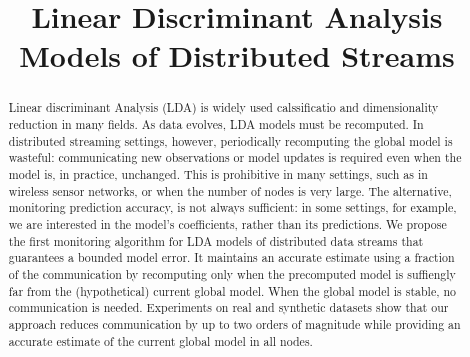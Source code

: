 \documentclass[11pt,twocolumn,varwidth=true,a4paper,fleqn]{article}
\begin{document}
\nocite{*}

\title{Linear Discriminant Analysis Models of Distributed Streams}
\date{}
\maketitle

\begin{abstract}
Linear discriminant Analysis (LDA) is widely used calssificatio and
dimensionality reduction in many fields.
As data evolves, LDA models must be recomputed. 
In distributed streaming settings, however, periodically recomputing the global model is
wasteful: communicating new observations or model updates
is required even when the model is, in practice, unchanged.
This is prohibitive in many settings, such as in wireless sensor
networks, or when the number of nodes is very large. The
alternative, monitoring prediction accuracy, is not always
sufficient: in some settings, for example, we are interested in
the model's coefficients, rather than its predictions.
We propose the first monitoring algorithm for LDA models of distributed data
streams that guarantees a bounded model error. It maintains an accurate estimate
using a fraction of the communication by recomputing only
when the precomputed model is suffiengly far from the
(hypothetical) current global model. When the global model
is stable, no communication is needed.
Experiments on real and synthetic datasets show that
our approach reduces communication by up to two orders
of magnitude while providing an accurate estimate of the
current global model in all nodes.
\end{abstract}
\end{document}
